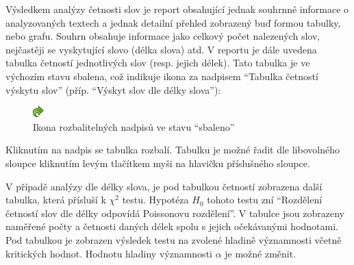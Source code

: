 \documentclass[dp.tex]{subfiles}
\begin{document}
Výsledkem analýzy četnosti slov je report obsahující jednak souhrnné informace o analyzovaných textech a jednak detailní přehled zobrazený buď formou tabulky, nebo grafu. Souhrn obsahuje informace jako celkový počet nalezených slov, nejčastěji se vyskytující slovo (délka slova) atd. V reportu je dále uvedena tabulka četností jednotlivých slov (resp. jejich délek). Tato tabulka je ve výchozím stavu sbalena, což indikuje ikona za nadpisem \enquote{Tabulka četností výskytu slov} (příp. \enquote{Výskyt slov dle délky slova}):

\begin{figure}[H]
\centering
\includegraphics[max width=\textwidth,keepaspectratio=true]{imgs-60-aplikace/gui-toggle-healine}
\caption{Ikona rozbalitelných nadpisů ve stavu \enquote{sbaleno}}
\label{fig:gui-toggle-healine}
\end{figure}

Kliknutím na nadpis se tabulka rozbalí. Tabulku je možné řadit dle libovolného sloupce kliknutím levým tlačítkem myši na hlavičku příslušného sloupce.

V případě analýzy dle délky slova, je pod tabulkou četností zobrazena další tabulka, která přísluší k $\chi^2$ testu. Hypotéza $H_0$ tohoto testu zní \enquote{Rozdělení četností slov dle délky odpovídá Poissonovu rozdělení}. V tabulce jsou zobrazeny naměřené počty a četnosti daných délek spolu s jejich očekávanými hodnotami. Pod tabulkou je zobrazen výsledek testu na zvolené hladině významnosti včetně kritických hodnot. Hodnotu hladiny významnosti  $\alpha$ je možné změnit.
\end{document}
